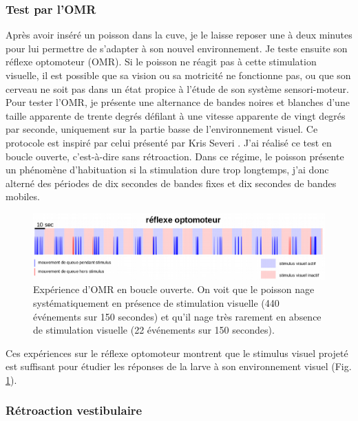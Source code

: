 \subsubsection{Test par l'OMR}
Après avoir inséré un poisson dans la cuve, je le laisse reposer une à deux minutes pour lui permettre de s'adapter à son nouvel environnement. Je teste ensuite son réflexe optomoteur (OMR). Si le poisson ne réagit pas à cette stimulation visuelle, il est possible que sa vision ou sa motricité ne fonctionne pas, ou que son cerveau ne soit pas dans un état propice à l'étude de son système sensori-moteur. Pour tester l'OMR, je présente une alternance de bandes noires et blanches d'une taille apparente de trente degrés défilant à une vitesse apparente de vingt degrés par seconde, uniquement sur la partie basse de l'environnement visuel. Ce protocole est inspiré par celui présenté par Kris Severi \cite{severi_neural_2014}. J'ai réalisé ce test en boucle ouverte, c'est-à-dire sans rétroaction. Dans ce régime, le poisson présente un phénomène d'habituation si la stimulation dure trop longtemps, j'ai donc alterné des périodes de dix secondes de bandes fixes et dix secondes de bandes mobiles.


\begin{figure}
    \centering
    \includegraphics[width=\textwidth]{./files/omr.png}
    \caption{Expérience d'OMR en boucle ouverte. On voit que le poisson nage systématiquement en présence de stimulation visuelle (440 événements sur 150 secondes) et qu'il nage très rarement en absence de stimulation visuelle (22 événements sur 150 secondes).}
    \label{FigOMRopenloop}
    \end{figure}

Ces expériences sur le réflexe optomoteur montrent que le stimulus visuel projeté est suffisant pour étudier les réponses de la larve à son environnement visuel (Fig. \ref{FigOMRopenloop}).

\subsubsection{Rétroaction vestibulaire}\label{subsubretrovestib}

